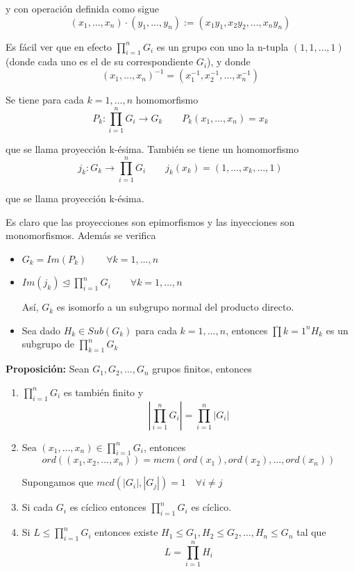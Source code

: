 \documentclass{article}
\begin{document}
y con operación definida como sigue
\begin{equation*}
(x_1,\ldots,x_n)\cdot (y_1,\ldots,y_n):=(x_1y_1,x_2y_2,\ldots,x_ny_n)
\end{equation*}

Es fácil ver que en efecto $\prod_{i=1}^n G_i$ es un grupo con uno la n-tupla $(1,1,\ldots,1)$ (donde cada uno es el de su correspondiente $G_i$), y donde
\begin{equation*}
(x_1,\ldots,x_n)^{-1}=(x_1^{-1},x_2^{-1},\ldots,x_n^{-1})
\end{equation*}

Se tiene para cada $k=1,\ldots,n$ homomorfismo
\begin{equation*}
P_k:\prod_{i=1}^n G_i\longrightarrow G_k\qquad P_k(x_1,\ldots,x_n)=x_k
\end{equation*}

que se llama proyección k-ésima. También se tiene un homomorfismo
\begin{equation*}
j_k:G_k\longrightarrow \prod_{i=1}^n G_i \qquad j_k(x_k)=(1,\ldots,x_k,\ldots,1)
\end{equation*}

que se llama proyección k-ésima.

Es claro que las proyecciones son epimorfismos y las inyecciones son monomorfismos. Además se verifica
\begin{itemize}
\item $G_k=Im(P_k)\qquad \forall k=1,\ldots,n$
\item $Im(j_k)\unlhd \prod_{i=1}^n G_i \qquad \forall k=1,\ldots,n$

Así, $G_k$ es isomorfo a un subgrupo normal del producto directo.
\item Sea dado $H_k\in Sub(G_k)$ para cada $k=1,\ldots,n$, entonces $\prod{k=1}^n H_k$ es un subgrupo de $\prod_{k=1}^n G_k$
\end{itemize}

\textbf{Proposición:} Sean $G_1,G_2,\ldots,G_n$ grupos finitos, entonces
\begin{enumerate}[(1)]
\item $\prod_{i=1}^n G_i$ es también finito y 
\begin{equation*}
|\prod_{i=1}^n G_i|=\prod_{i=1}^n |G_i|
\end{equation*}

\item Sea $(x_1,\ldots,x_n)\in  \prod_{i=1}^n G_i$, entonces 
\begin{equation*}
ord((x_1,x_2,\ldots,x_n))=mcm(ord(x_1),ord(x_2),\ldots,ord(x_n))
\end{equation*}

Supongamos que $mcd(|G_i|,|G_j|)=1 \quad \forall i\neq j$

\item Si cada $G_i$ es cíclico entonces $\prod_{i=1}^n G_i$ es cíclico.

\item Si $L\leq \prod_{i=1}^n G_i$ entonces existe $H_1\leq G_1,H_2\leq G_2,\ldots ,H_n\leq G_n$ tal que
\begin{equation*}
L=\prod_{i=1}^n H_i
\end{equation*}
\end{enumerate}
\end{document}
